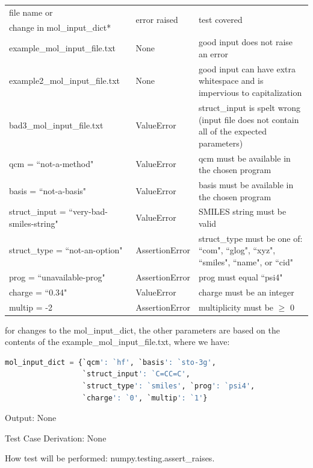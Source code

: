 \documentclass[12pt, titlepage]{article}
\begin{document}
\begin{enumerate}
\begin{table}[H]
	\begin{tabularx}{\textwidth}{p{5cm}p{3cm}p{6.5cm}}
		\toprule
		file name or & \multirow{2}{*}{error raised} & \multirow{2}{*}{test 
			covered} \\
		change in mol\_input\_dict*& & \\
		\midrule
		example\_mol\_input\_file.txt & None & good input does not raise an 
		error \\
		example2\_mol\_input\_file.txt & None & good input can have extra 
		whitespace and is impervious to capitalization \\
		bad3\_mol\_input\_file.txt & ValueError & struct\_input is spelt wrong 
		(input file does not contain all of the expected parameters) \\
		qcm = ``not-a-method" & ValueError & qcm must be available in the 
		chosen program \\
		basis = ``not-a-basis" & ValueError & basis must be available in the 
		chosen program \\
		struct\_input = ``very-bad-smiles-string" & ValueError & SMILES string 
		must be valid \\
		struct\_type = ``not-an-option" & AssertionError & struct\_type must be 
		one of: ``com", ``glog", ``xyz", ``smiles", ``name", or ``cid" \\
		prog = ``unavailable-prog" & AssertionError & prog must equal ``psi4" \\
		charge = ``0.34" & ValueError & charge must be an integer \\
		multip = -2 & AssertionError & multiplicity must be $\geq$ 0 \\
	\end{tabularx}
\end{table}

\noindent * for changes to the mol\_input\_dict, the other parameters are based 
on the contents of the example\_mol\_input\_file.txt, where we have:
\begin{lstlisting}[language=python, showstringspaces=false]
mol_input_dict = {`qcm': `hf', `basis': `sto-3g',
                  `struct_input': `C=CC=C',
                  `struct_type': `smiles', `prog': `psi4',
                  `charge': `0', `multip': `1'}
\end{lstlisting}

Output: None

Test Case Derivation: None

How test will be performed: numpy.testing.assert\_raises.
	
\end{enumerate}
\end{document}
